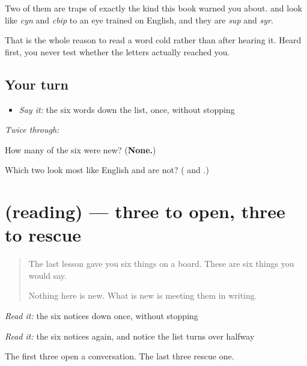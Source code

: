 Two of them are traps of exactly the kind this book warned you about. \textbf{} and \textbf{} look like \emph{cyn} and \emph{cbip} to an eye trained on English, and they are \emph{sup} and \emph{syr}.

That is the whole reason to read a word cold rather than after hearing it. Heard first, you never test whether the letters actually reached you.

\subsection*{Your turn}
\begin{itemize}
\raggedright
  \item \emph{Say it:} the six words down the list, once, without stopping
\end{itemize}

\emph{Twice through:}

\begin{tcolorbox}[breakable,colback=teal!4,colframe=teal!35!black,title={Before you move on}]
How many of the six were new? (\textbf{None.})

Which two look most like English and are not? (\textbf{} and \textbf{}.)
\end{tcolorbox}
\section[(reading)]{(reading) — three to open, three to rescue}

\label{lesson:RU-C27-notices}



\begin{quote}
The last lesson gave you six things on a board. These are six things you would say.

Nothing here is new. What is new is meeting them in writing.
\end{quote}

\begin{tcolorbox}[breakable,skin=enhanced,colback=orange!6,colframe=orange!45!black,boxrule=0.5pt,arc=1mm,left=6pt,right=6pt,top=4pt,bottom=4pt,fonttitle=\bfseries,title={Read this}]
\begin{quote}
     
\end{quote}

\emph{Read it:} the six notices down once, without stopping

\emph{Read it:} the six notices again, and notice the list turns over halfway

The first three open a conversation. The last three rescue one.
\end{tcolorbox}

